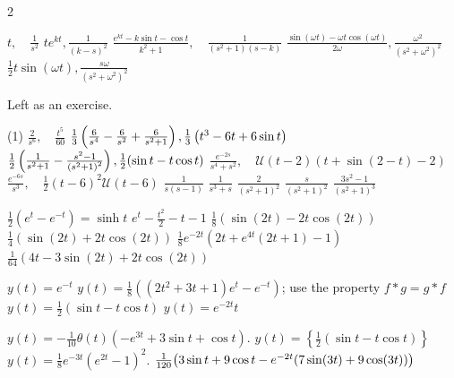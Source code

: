 \begin{multicols}{2}\scriptsize
	\begin{Answer}[ref={EX75}]
		\Question \label{7-5-1a}
		\begin{tasks}
			\task $t,\quad \frac{1}{s^2}$
			\task $t  e^{k t},\frac{1}{(k-s)^2}$
			\task $\frac{e^{k t}-k \sin t-\cos t}{k^2+1},\quad \frac{1}{\left(s^2+1\right) (s-k)}$
			\task $\frac{ \sin (\omega t )-\omega t \cos (\omega t )}{2 \omega },\frac{\omega ^2}{\left(s^2+\omega ^2\right)^2}$
			\task $\frac{1}{2} t \sin (\omega t),\frac{s \omega }{\left(s^2+\omega ^2\right)^2}$
		\end{tasks} 
		
	\Question\label{7-5-2a} Left as an exercise.
	
	\Question \label{7-5-3a}
	\begin{tasks}(1)
		\task $\frac{2}{s^6},\quad \frac{t^5}{60}$
		\task $\frac{1}{3} \left(\frac{6}{s^4}-\frac{6}{s^2}+\frac{6}{s^2+1}\right),\\ \frac{1}{3} \left(t^3-6 t+6 \sin t\right)$
		\task $\frac{1}{2} \left(\frac{1}{s^2+1}-\frac{s^2-1}{\left(s^2+1\right)^2}\right),\\ \frac{1}{2}  (\sin t-t \cos t)$
		\task $\frac{e^{-2 s}}{s^4+s^2},\quad \mathcal{U} (t-2) (t+\sin (2-t)-2)$
		\task $\frac{e^{-6 s}}{s^3},\quad \frac{1}{2} (t-6)^2 \mathcal{U}(t-6)$
		\task $\frac{1}{s(s-1)}$
		\task $\frac{1}{s^3+s}$
		\task $\frac{2}{\left(s^2+1\right)^2}$
		\task $\frac{s}{\left(s^2+1\right)^2}$
		\task $\frac{3 s^2-1}{\left(s^2+1\right)^3}$
	\end{tasks}
			
		\Question\label{7-5-4a}
	\begin{tasks}
		\task  $\frac{1}{2} \left(e^{ t}-e^{-t}\right) =\sinh t$
		\task	$e^t-\frac{t^2}{2}-t-1$
		\task $\frac{1}{8} (\sin (2 t)-2 t \cos (2 t))$
		\task $\frac{1}{4} (\sin (2 t)+2 t \cos (2 t))$
		\task $\frac{1}{8} e^{-2 t} \left(2 t+e^{4 t} (2 t+1)-1\right)$
		\task $\frac{1}{64} (4 t-3 \sin (2 t)+2 t \cos (2 t))$
	\end{tasks}
		
		\Question\label{7-5-5a}
		\begin{tasks}
			\task $y(t) = e^{-t}$
			\task $y(t) = \frac{1}{8}  \left((2 t^2 +3t+1)e^t -e^{-t}\right)$; use the property $f\ast g = g\ast f$	
			\task $y(t)= \frac{1}{2} (\sin t-t \cos t)$
			\task $y(t)=e^{-2 t} t$
		\end{tasks}	
		
			\Question\label{7-5-6a}
		\begin{tasks}
			\task $y(t) = -\frac{1}{10} \theta (t) \left(-e^{3 t}+3 \sin t+\cos t\right).$
			\task $y(t) = \left\{\frac{1}{2} (\sin t-t \cos t)\right\}$
			\task $y(t) = \frac{1}{8} e^{-3 t} \left(e^{2 t}-1\right)^2.$
			\task $\frac{1}{120} \big(3 \sin t+9 \cos t\\-e^{-2 t} (7 \sin (3 t)+9 \cos (3 t))\big)$
		\end{tasks}
		

\end{Answer}
\end{multicols}
